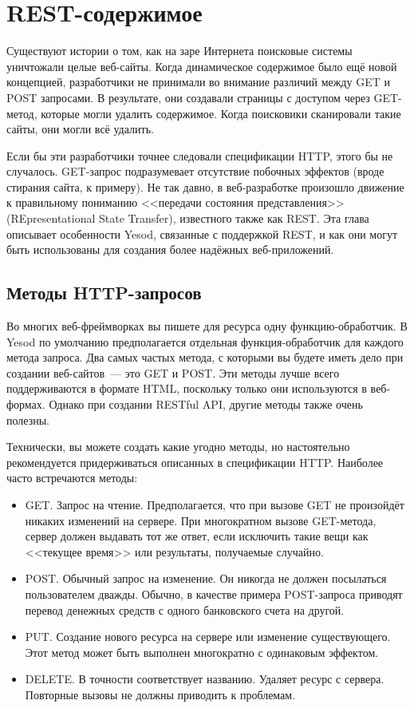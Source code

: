 \chapter{REST-содержимое}

Существуют истории о том, как  на заре Интернета поисковые системы
уничтожали целые веб-сайты. Когда динамическое содержимое было ещё новой концепцией,
разработчики не принимали во внимание различий между GET и POST запросами. В результате,
они создавали страницы с доступом через GET-метод, которые могли удалить содержимое. Когда
поисковики сканировали такие сайты, они могли всё удалить.

Если бы эти разработчики точнее следовали спецификации HTTP, этого бы не случалось.
GET-запрос подразумевает отсутствие побочных эффектов (вроде стирания сайта, к примеру).
Не так давно, в веб-разработке произошло движение к правильному пониманию <<передачи
состояния представления>> (REpresentational State Transfer), известного также как REST.
Эта
глава описывает особенности Yesod, связанные с поддержкой REST, и как они могут быть
использованы для создания более надёжных веб-приложений.

\section{Методы HTTP-запросов}

Во многих веб-фреймворках вы пишете для ресурса одну функцию-обработчик. В
Yesod по умолчанию предполагается отдельная функция-обработчик для каждого метода
запроса. Два самых частых метода, с которыми вы будете иметь дело при создании веб-сайтов~---
это GET и POST. Эти методы лучше всего поддерживаются в формате HTML, поскольку только
они используются в веб-формах. Однако при создании RESTful API, другие методы также очень
полезны.

Технически, вы можете создать какие угодно методы, но настоятельно рекомендуется
придерживаться описанных в спецификации HTTP. Наиболее часто встречаются методы:
\begin{itemize}
 \item GET. Запрос на чтение. Предполагается, что при вызове GET не произойдёт никаких
 изменений на сервере. При многократном вызове GET-метода, сервер должен выдавать тот же
ответ, если исключить такие вещи как <<текущее время>> или результаты, получаемые
случайно.
 \item POST. Обычный запрос на изменение. Он никогда не должен посылаться пользователем
дважды. Обычно, в качестве примера POST-запроса приводят перевод денежных средств с
одного банковского счета на другой.
 \item PUT. Создание нового ресурса на сервере или изменение существующего. Этот метод
 может быть выполнен многократно с одинаковым эффектом.
 \item DELETE. В точности соответствует названию. Удаляет ресурс с сервера. Повторные
 вызовы не должны приводить к проблемам.
\end{itemize}

